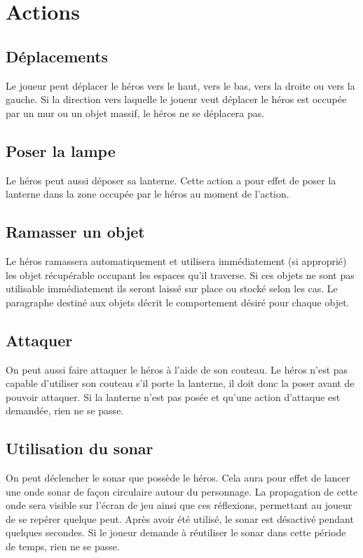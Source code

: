 \documentclass[a4paper, 11pt]{report}
\begin{document}
    \chapter{Actions}
      
      \section{Déplacements}
        Le joueur peut déplacer le héros vers le haut, vers le bas, vers la droite ou vers la gauche. Si la 
        direction vers laquelle le joueur veut déplacer le héros est occupée par un mur ou un objet massif, 
        le héros ne se déplacera pas.

      \section{Poser la lampe}
        Le héros peut aussi déposer sa lanterne. Cette action a pour effet de poser la lanterne dans la zone
        occupée par le héros au moment de l'action.
        
      \section{Ramasser un objet}
        Le héros ramassera automatiquement et utilisera immédiatement (si approprié) les objet récupérable
        occupant les espaces qu'il traverse. Si ces objets ne sont pas utilisable immédiatement ils seront
        laissé sur place ou stocké selon les cas. Le paragraphe destiné aux objets décrit le comportement
        désiré pour chaque objet.
        
      \section{Attaquer}
        On peut aussi faire attaquer le héros à l'aide de son couteau. Le héros n'est pas capable d'utiliser son
        couteau s'il porte la lanterne, il doit donc la poser avant de pouvoir attaquer. Si la lanterne n'est pas
        posée et qu'une action d'attaque est demandée, rien ne se passe.
        
      \section{Utilisation du sonar}
        On peut déclencher le sonar que possède le héros. Cela aura pour effet de lancer une onde sonar de
        façon circulaire autour du personnage. La propagation de cette onde sera visible sur l'écran de jeu 
        ainsi que ces réflexions, permettant au joueur de se repérer quelque peut. Après avoir été utilisé, le 
        sonar est désactivé pendant quelques secondes. Si le joueur demande à réutiliser le sonar dans cette
        période de temps, rien ne se passe.
\end{document}
